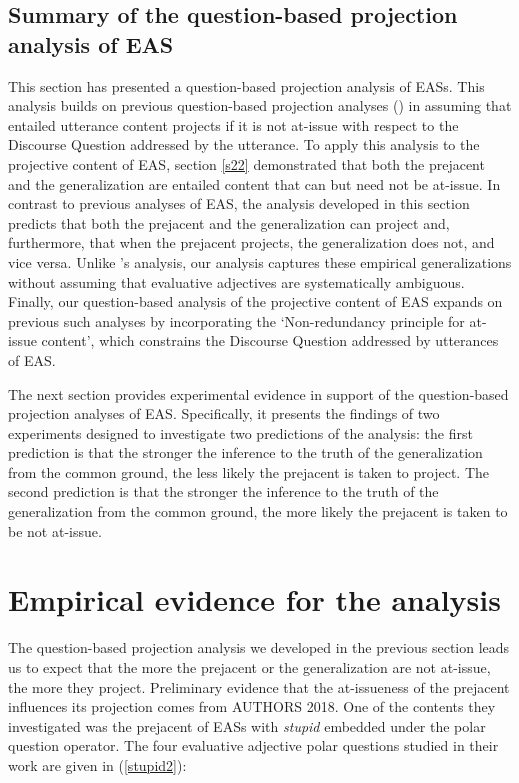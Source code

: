 \documentclass[11pt,fleqn]{article}
\newcommand{\6}{\mbox{$[\hspace*{-.6mm}[$}}
\newcommand{\9}{\mbox{$]\hspace*{-.6mm}]$}}
\newcommand{\citepos}[1]{\citeauthor{#1}'s \citeyear{#1}}
\begin{document}
\subsection{Summary of the question-based projection analysis of EAS}

This section has presented a question-based projection analysis of EASs. This analysis builds on previous question-based projection analyses (\citealt{best-question,brst-ar}) in assuming that entailed utterance content projects if it is not at-issue with respect to the Discourse Question addressed by the utterance. To apply this analysis to the projective content of EAS, section \ref{s22} demonstrated that both the prejacent and the generalization are entailed content that can but need not be at-issue. In contrast to previous analyses of EAS, the analysis developed in this section predicts that both the prejacent and the generalization can project and, furthermore, that when the prejacent projects, the generalization does not, and vice versa. Unlike \citepos{karttunen-etal2014} analysis, our analysis captures these empirical generalizations without assuming that evaluative adjectives are systematically ambiguous. Finally, our question-based analysis of the projective content of EAS expands on previous such analyses by incorporating the `Non-redundancy principle for at-issue content', which constrains the Discourse Question addressed by utterances of EAS.

The next section provides experimental evidence in support of the question-based projection analyses of EAS. Specifically, it presents the findings of two experiments designed to investigate two predictions of the analysis: the first prediction is that the stronger the inference to the truth of the generalization from the common ground, the less likely the prejacent is taken to project. The second prediction is that the stronger the inference to the truth of the generalization from the common ground, the more likely the prejacent is taken to be not at-issue.

\section{Empirical evidence for the analysis}\label{s3}

The question-based projection analysis we developed in the previous section leads us to expect that the more the prejacent or the generalization are not at-issue, the more they project. Preliminary evidence that the at-issueness of the prejacent influences its projection comes from AUTHORS 2018. One of the contents they investigated was the prejacent of EASs with {\em stupid} embedded under the polar question operator. The four evaluative adjective polar questions studied in their work are given in (\ref{stupid2}):
\end{document}
